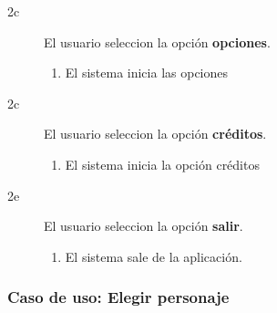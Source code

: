 \begin{description}
\begin{description}
            \item[2c ] El usuario seleccion la opción \textbf{opciones}.
            \begin{enumerate}
                \item El sistema inicia las opciones
            \end{enumerate}
            
            \item[2c ] El usuario seleccion la opción \textbf{créditos}.
            \begin{enumerate}
                \item El sistema inicia la opción créditos
            \end{enumerate}
            
            \item[2e ] El usuario seleccion la opción \textbf{salir}.
            \begin{enumerate}
                \item El sistema sale de la aplicación.
            \end{enumerate}
            
        \end{description}
\end{description}

\subsubsection{Caso de uso: Elegir personaje}

